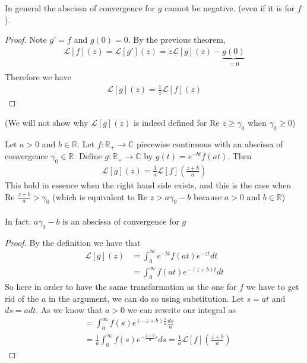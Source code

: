 \begin{framedremark}
In general the abscissa of convergence for $g$ cannot be negative. (even if it is for $f$).
\end{framedremark}


\begin{proof}
    Note $g' = f$ and $g\left(0\right) = 0$. By the previous theorem,
	\begin{align*} 
		\mathcal{L}\left[f\right]\left(z\right) = \mathcal{L}\left[g'\right]\left(z\right) = z \mathcal{L}\left[g\right]\left(z\right) - \underbrace{g\left(0\right)}_{= 0}\\
	\end{align*}
	Therefore we have 
	\begin{align*} 
		\mathcal{L}\left[g\right]\left(z\right) = \frac{1}{z}\mathcal{L}\left[f\right]\left(z\right)
	\end{align*}
\end{proof}
(We will not show why $\mathcal{L}\left[g\right]\left(z\right)$ is indeed defined for $\text{Re }z \geq \gamma_0$ when $\gamma_0 \geq 0$)



\begin{theoreme}
Let $a > 0$ and $b \in \mathbb{R}$. Let $f : \mathbb{R}_+ \to \mathbb{C}$ piecewise continuous with an abscissa of convergence $\gamma_0 \in \mathbb{R}$. Define $g : \mathbb{R}_+ \to \mathbb{C}$ by $g\left(t\right) = e^{-bt}f\left(at\right)$. Then
\begin{align*} 
	\mathcal{L}\left[g\right]\left(z\right) = \frac{1}{a}\mathcal{L}\left[f\right]\left(\frac{z + b}{a}\right)
\end{align*}
	This hold in essence when the right hand side exists, and this is the case when $\text{Re } \frac{z + b}{a} > \gamma_0$ (which is equivalent to $\text{Re }z > a \gamma_0 - b$ because $a > 0$ and $b \in \mathbb{R}$)\\
	$ $\\
	In fact: $a \gamma_0 - b$ is an abscissa of convergence for $g$
\end{theoreme}
\begin{proof}
    By the definition we have that 
	\begin{align*} 
		\mathcal{L}\left[g\right]\left(z\right) &=  \int_0^{\infty}e^{-bt}f\left(at\right)e^{-zt}dt\\
		&=  \int_0^{\infty}f\left(at\right) e^{-\left(z + b\right)t}dt 
	\end{align*}
	So here in order to have the same transformation as the one for $f$ we have to get rid of the $a$ in the argument, we can do so using substitution. Let $s = at$ and $ds =  adt$. As we know that $a > 0$ we can rewrite our integral as
	\begin{align*} 
		&=  \int_0^{\infty}f\left(s\right) e^{\left(-z + b\right)\frac{s}{a}}\frac{ds}{a}\\
		&= \frac{1}{a}\int_0^{\infty}f\left(s\right)e^{-\frac{z + b}{a}s}ds = \frac{1}{a}\mathcal{L}\left[f\right]\left(\frac{z + b}{a}\right)
	\end{align*}
\end{proof}


